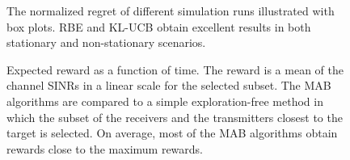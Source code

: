 \documentclass[english, 12pt, a4paper, elec, utf8, a-1b, online]{aaltothesis}
\numberwithin{equation}{section}
\begin{document}
\begin{figure}[!tb]\centering
    \hfill
    \caption{The normalized regret of different simulation runs illustrated with box plots.
            RBE and KL-UCB obtain excellent results in both stationary and non-stationary scenarios.}
    \label{fig:ci}
\end{figure}

\begin{figure}[!tb]
    \hfill
    \caption{Expected reward as a function of time.
    The reward is a mean of the channel SINRs in a linear scale for the selected subset.
    The MAB algorithms are compared to a simple exploration-free method in which the subset of the receivers and the transmitters closest to the target is selected.
    On average, most of the MAB algorithms obtain rewards close to the maximum rewards.}
    \label{fig:sinr}
\end{figure}
\end{document}
